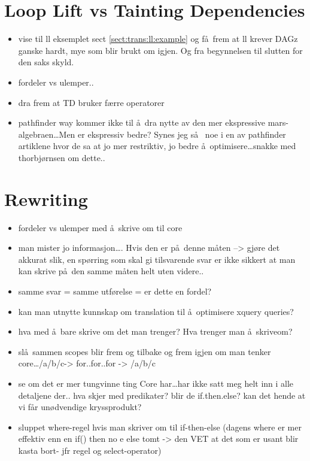 \section{Loop Lift vs Tainting Dependencies}
\label{sect:disc:llvsmXr}
\begin{itemize}
  \item vise til ll eksemplet sect \ref{sect:trans:ll:example} og f\aa~frem at ll krever DAGz ganske hardt,
  mye som blir brukt om igjen. Og fra begynnelsen til slutten for den saks skyld.
  \item fordeler vs ulemper..
  \item dra frem at TD bruker f\ae rre operatorer
  \item pathfinder way kommer ikke til \aa~dra nytte av den mer ekspressive mars-algebraen\ldots Men er ekspressiv
	  bedre? Synes jeg s\aa~ noe i en av pathfinder artiklene hvor de sa at jo mer restriktiv, jo bedre
	  \aa~optimisere\ldots snakke med thorbj\o rnsen om dette..
\end{itemize}

\section{Rewriting}
\label{sect:disc:rewriting}
\begin{itemize}
  \item fordeler vs ulemper med \aa~skrive om til core
  \item man mister jo informasjon\ldots. Hvis den er p\aa~denne m\aa ten --> gj\o re det akkurat
	  slik, en sp\o rring som skal gi tilsvarende svar er ikke sikkert at man kan
	  skrive p\aa~den samme m\aa ten helt uten videre..  
  \item samme svar = samme utf\o relse = er dette en fordel?
  \item kan man utnytte kunnskap om translation til \aa~optimisere xquery queries?
  \item hva med \aa~bare skrive om det man trenger? Hva trenger man \aa~skriveom?
  \item sl\aa~sammen scopes blir frem og tilbake og frem igjen om man tenker core\ldots /a/b/c-> for..for..for ->
  /a/b/c
  \item se om det er mer tungvinne ting Core har\ldots har ikke satt meg helt inn i alle detaljene der.. hva skjer
  med predikater? blir de if.then.else? kan det hende at vi f\aa r un\o dvendige kryssprodukt?
  \item sluppet where-regel hvis man skriver om til if-then-else (dagens where er mer effektiv enn en if() then no
 e else tomt -> den VET at det som er usant blir kasta bort- jfr regel og select-operator)
\end{itemize}

